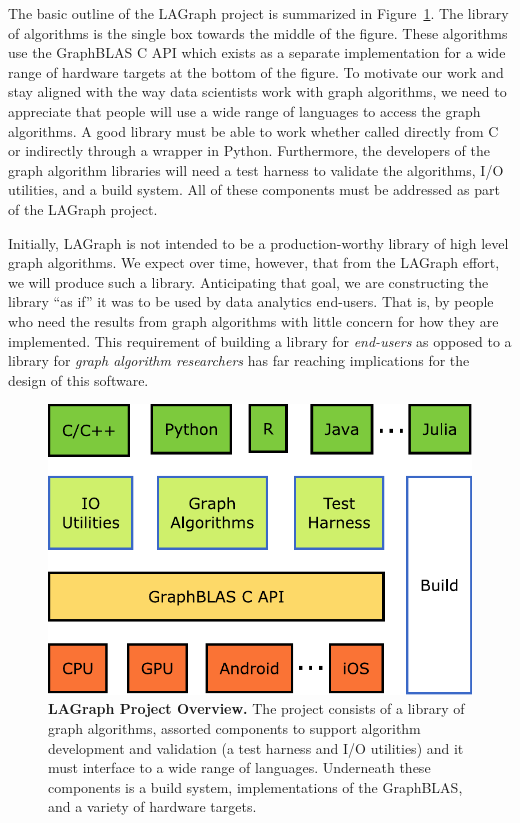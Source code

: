 The basic outline of the LAGraph project  is summarized in 
Figure~\ref{fig:overview}. The library of algorithms is the single box towards
the middle of the figure.  These algorithms use the GraphBLAS C API
which exists as a separate implementation for a wide range of hardware
targets at the bottom of the figure.  To motivate our work and stay aligned 
with the way data scientists work with graph algorithms, we need to appreciate that
people will use a wide range of languages to access the graph algorithms.  A good library
must be able to work whether called directly from C or indirectly through a wrapper in Python.
Furthermore, the developers of the graph algorithm libraries will need a test harness to
validate the algorithms, I/O utilities, and a build system.  All of these components must
be addressed as part of the LAGraph project. 

Initially, LAGraph is not intended to be a production-worthy library of 
high level graph algorithms.  We expect over time, however, that from the LAGraph 
effort, we will produce such a library.  Anticipating that goal, we are constructing
the library ``as if'' it was to be used by data analytics end-users. That is, by people
who need the results from graph algorithms with little concern for how they are
implemented.  This requirement of building a library for \emph{end-users} as opposed to 
a library for \emph{graph algorithm researchers} has far reaching implications for the 
design of this software.

\begin{figure}[t]
	\includegraphics[width=\linewidth]{fig/lagraph}
	\caption{\textbf{LAGraph Project Overview.} The project consists of a library of 
	graph algorithms, assorted components to support algorithm development and validation
	(a test harness and I/O utilities) and it must interface to a wide range of languages.
	Underneath these components is a build system, implementations of the GraphBLAS,
	and a variety of hardware targets. \label{fig:overview}}
\end{figure}

